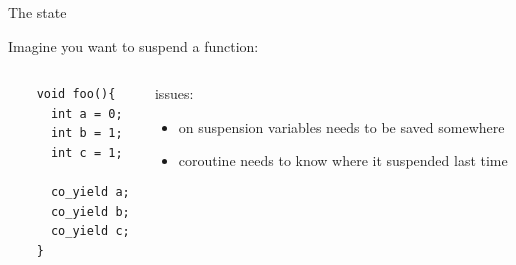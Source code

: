 \documentclass[10pt]{beamer}
\begin{document}

\begin{frame}[fragile]{The state}

\centerline{Imagine you want to suspend a function:}

\vfill

\begin{columns}
\begin{column}{0.48\linewidth}
\begin{verbatim}
    void foo(){
      int a = 0;
      int b = 1;
      int c = 1;
  
      co_yield a;
      co_yield b;
      co_yield c;
    }
\end{verbatim}
\end{column}
\pause
\begin{column}{0.48\linewidth}

\centerline{issues:}

\begin{itemize}[<+- |alert@+>]
  \item on suspension variables needs to be saved somewhere
  \item coroutine needs to know where it suspended last time
\end{itemize}

\end{column}
\end{columns}
\end{frame}
\end{document}
